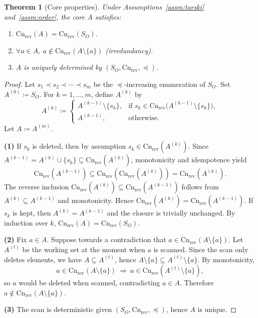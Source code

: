 \documentclass[twoside]{article}
\newtheorem{theorem}{Theorem}[section]
\newcommand{\Cn}{\mathrm{Cn}}
\newcommand{\1}{\mathbf{1}}
\begin{document}
\begin{theorem}[Core properties]
\label{thm:core-properties}
Under Assumptions~\ref{assm:tarski} and~\ref{assm:order}, the core \(A\) satisfies:
\begin{enumerate}
  \item \(\Cn_{\mathrm{rev}}(A)=\Cn_{\mathrm{rev}}(S_O)\).
  \item \(\forall a\in A,\ a\notin \Cn_{\mathrm{rev}}(A\setminus\{a\})\) (irredundancy).
  \item \(A\) is uniquely determined by \((S_O,\Cn_{\mathrm{rev}},\preceq)\).
\end{enumerate}
\end{theorem}

\begin{proof}
Let \(s_1\prec s_2\prec \cdots \prec s_m\) be the \(\preceq\)-increasing enumeration of \(S_O\).
Set \(A^{(0)}\coloneqq S_O\). For \(k=1,\dots,m\), define \(A^{(k)}\) by
\[
A^{(k)}\coloneqq
\begin{cases}
A^{(k-1)}\setminus\{s_k\}, & \text{if } s_k\in \Cn_{\mathrm{rev}}\!\bigl(A^{(k-1)}\setminus\{s_k\}\bigr),\\
A^{(k-1)}, & \text{otherwise.}
\end{cases}
\]
Let \(A\coloneqq A^{(m)}\).

\noindent\textbf{(1)} If \(s_k\) is deleted, then by assumption
\(s_k\in \Cn_{\mathrm{rev}}(A^{(k)})\). Since \(A^{(k-1)}=A^{(k)}\cup\{s_k\}\subseteq \Cn_{\mathrm{rev}}(A^{(k)})\),
monotonicity and idempotence yield
\[
\Cn_{\mathrm{rev}}(A^{(k-1)})\subseteq \Cn_{\mathrm{rev}}(\Cn_{\mathrm{rev}}(A^{(k)}))
=\Cn_{\mathrm{rev}}(A^{(k)}).
\]
The reverse inclusion \(\Cn_{\mathrm{rev}}(A^{(k)})\subseteq \Cn_{\mathrm{rev}}(A^{(k-1)})\) follows from
\(A^{(k)}\subseteq A^{(k-1)}\) and monotonicity. Hence
\(\Cn_{\mathrm{rev}}(A^{(k)})=\Cn_{\mathrm{rev}}(A^{(k-1)})\).
If \(s_k\) is kept, then \(A^{(k)}=A^{(k-1)}\) and the closure is trivially unchanged.
By induction over \(k\), \(\Cn_{\mathrm{rev}}(A)=\Cn_{\mathrm{rev}}(S_O)\).

\noindent\textbf{(2)} Fix \(a\in A\). Suppose towards a contradiction that
\(a\in \Cn_{\mathrm{rev}}(A\setminus\{a\})\).
Let \(A^{(t)}\) be the working set at the moment when \(a\) is scanned.
Since the scan only deletes elements, we have \(A\subseteq A^{(t)}\), hence
\(A\setminus\{a\}\subseteq A^{(t)}\setminus\{a\}\).
By monotonicity,
\[
a\in \Cn_{\mathrm{rev}}(A\setminus\{a\})
\ \Rightarrow\
a\in \Cn_{\mathrm{rev}}(A^{(t)}\setminus\{a\}),
\]
so \(a\) would be deleted when scanned, contradicting \(a\in A\).
Therefore \(a\notin \Cn_{\mathrm{rev}}(A\setminus\{a\})\).

\noindent\textbf{(3)} The scan is deterministic given \((S_O,\Cn_{\mathrm{rev}},\preceq)\), hence \(A\) is unique.
\end{proof}
\end{document}
